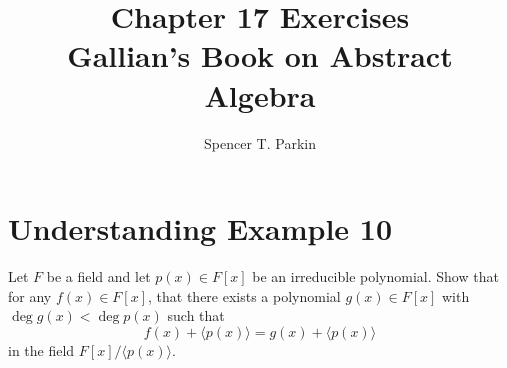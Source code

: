 \documentclass[12pt]{article}
\title{Chapter 17 Exercises\\Gallian's Book on Abstract Algebra}
\author{Spencer T. Parkin}
\begin{document}
\maketitle

\section*{Understanding Example 10}

Let $F$ be a field and let $p(x)\in F[x]$ be an irreducible polynomial.
Show that for any $f(x)\in F[x]$, that there exists a polynomial
$g(x)\in F[x]$ with $\deg g(x)<\deg p(x)$ such that
\begin{equation*}
f(x)+\langle p(x)\rangle=g(x)+\langle p(x)\rangle
\end{equation*}
in the field $F[x]/\langle p(x)\rangle$.
\end{document}
